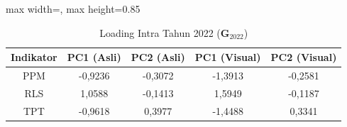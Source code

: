 \begin{table}[H]
\centering
\caption{Loading Intra Tahun 2022 ($\mathbf{G}_{2022}$)} \label{tab:sample2loading_intra_2022}
\begin{adjustbox}{max width=\textwidth, max height=0.85\textheight}
\begin{tabular}{|c|c|c|c|c|}
\hline
\textbf{Indikator} & \textbf{PC1 (Asli)} & \textbf{PC2 (Asli)} & \textbf{PC1 (Visual)} & \textbf{PC2 (Visual)} \\
\hline
PPM & -0,9236 & -0,3072 & -1,3913 & -0,2581 \\
RLS & 1,0588 & -0,1413 & 1,5949 & -0,1187 \\
TPT & -0,9618 & 0,3977 & -1,4488 & 0,3341 \\
\hline
\end{tabular}
\end{adjustbox}
\end{table}